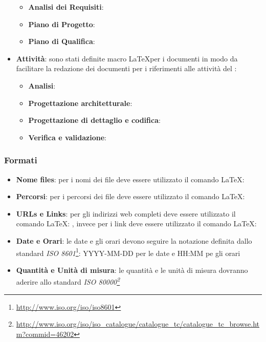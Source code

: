 \documentclass[12pt,a4paper]{article}
\begin{document}
\begin{itemize}
\begin{itemize}
		\item \textbf{Analisi dei Requisiti}: 
		\item \textbf{Piano di Progetto}: 
		\item \textbf{Piano di Qualifica}: 
	\end{itemize}
	\item \textbf{Attività}: sono stati definite macro  \LaTeX per i documenti in modo da facilitare la redazione dei documenti per i riferimenti alle attività del \PdP:
	\begin{itemize}
		\item \textbf{Analisi}: 
		\item \textbf{Progettazione architetturale}: 
		\item \textbf{Progettazione di dettaglio e codifica}: 
		\item \textbf{Verifica e validazione}: 
	\end{itemize}
\end{itemize}

\subsubsection{Formati}\label{formati}
\begin{itemize}
	\item \textbf{Nome files}: per i nomi dei file deve essere utilizzato il comando \LaTeX: 
	\item  \textbf{Percorsi}: per i percorsi dei file deve essere utilizzato il comando \LaTeX: 
	\item \textbf{URLs e Links}:  per gli indirizzi web completi deve essere utilizzato il comando \LaTeX: , invece per i link deve essere utilizzato il comando \LaTeX: 
	\item \textbf{Date e Orari}: le date e gli orari devono seguire la notazione definita dallo standard \emph{ISO 8601}\footnote{\url{http://www.iso.org/iso/iso8601}}: YYYY-MM-DD per le date e HH:MM pe gli orari
	\item \textbf{Quantità e Unità di misura}: le quantità e le unità di misura dovranno aderire allo standard \emph{ISO 80000\footnote{\url{http://www.iso.org/iso/iso_catalogue/catalogue_tc/catalogue_tc_browse.htm?commid=46202}}}
\end{itemize}
\end{document}
